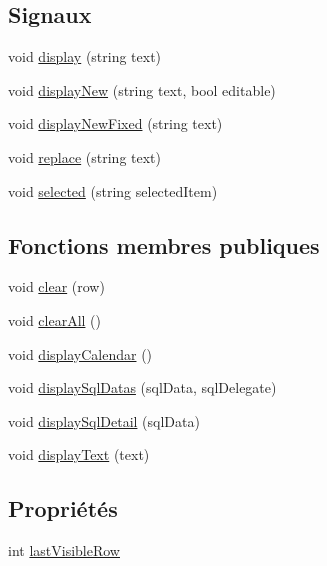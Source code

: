 \subsection*{Signaux}
\begin{DoxyCompactItemize}
\item 
void \hyperlink{classSH__OutputZone_a137f08121743a873a4b803378564b831}{display} (string text)
\item 
void \hyperlink{classSH__OutputZone_ae5a2247f1c3223e5a73de52fdbdb821b}{display\-New} (string text, bool editable)
\item 
void \hyperlink{classSH__OutputZone_a899a18d02081f15ec88699652926d1b2}{display\-New\-Fixed} (string text)
\item 
void \hyperlink{classSH__OutputZone_af5abdd0bd587e4df3ed9278192978da5}{replace} (string text)
\item 
void \hyperlink{classSH__OutputZone_a41c89f3ac170cc1fa3f2946c155da958}{selected} (string selected\-Item)
\end{DoxyCompactItemize}
\subsection*{Fonctions membres publiques}
\begin{DoxyCompactItemize}
\item 
void \hyperlink{classSH__OutputZone_a5e060d86ebcea9f4dd4acfd203d324de}{clear} (row)
\item 
void \hyperlink{classSH__OutputZone_a90e3b3d2bdd58bef244d5a347ddcf74a}{clear\-All} ()
\item 
void \hyperlink{classSH__OutputZone_a3fb363c9732edb963b97a0af893378a7}{display\-Calendar} ()
\item 
void \hyperlink{classSH__OutputZone_ad898491cb4e3c7f27d1a020a12b0de83}{display\-Sql\-Datas} (sql\-Data, sql\-Delegate)
\item 
void \hyperlink{classSH__OutputZone_a5a785363482e4bd17c0f9cee4d29e2ee}{display\-Sql\-Detail} (sql\-Data)
\item 
void \hyperlink{classSH__OutputZone_a2643d4fe88a476c2296f9e7a44da6c62}{display\-Text} (text)
\end{DoxyCompactItemize}
\subsection*{Propriétés}
\begin{DoxyCompactItemize}
\item 
int \hyperlink{classSH__OutputZone_ae324bcdd20ad4a9e435678d045964dc9}{last\-Visible\-Row}
\end{DoxyCompactItemize}


